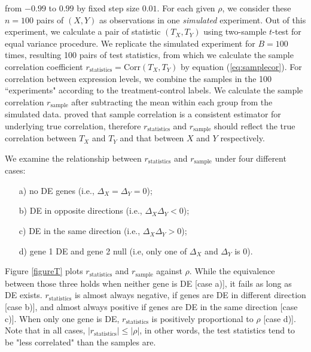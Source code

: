 \documentclass[12pt, a4paper]{article}
\newcommand{\cor}{\text{Corr}}
\begin{document}
	from $-0.99$ to $0.99$ by fixed step size $0.01$. For each given $\rho$, we consider these $n=100$ pairs of $(X, Y)$
	as observations in one \textit{simulated} experiment. Out of this experiment, we calculate a pair of statistic $(T_X, T_Y)$ using 
	two-sample $t$-test for equal variance procedure. We replicate the simulated
	experiment for $B=100$ times, resulting 100 pairs of test statistics, from which we calculate the sample correlation coefficient
	$r_\text{statistics} = \cor(T_X, T_Y)$ by equation (\ref{eq:samplecor}). For correlation between expression levels, we combine
	the samples in the 100 ``experiments" according to the treatment-control labels. We calculate
	the sample correlation $r_{\text{sample}}$ after subtracting the mean within each group from the simulated data. 
	\citet{fisher1915frequency} proved that sample correlation is a consistent estimator for underlying true correlation, therefore
		$r_\text{statistics}$ and $r_{\text{sample}}$ should reflect the true correlation between $T_X$ and $T_Y$ and 
		that between $X$ and $Y$ respectively. 
	
	We examine the relationship between $r_\text{statistics}$ and $r_{\text{sample}}$ under four different cases:
	\begin{enumerate}
		\item[a)] no DE genes (i.e., $\Delta_X = \Delta_Y  =0$);
		\item[b)]  DE in opposite directions (i.e., $\Delta_X\Delta_Y <0$);
		\item[c)] DE in the same direction (i.e., $\Delta_X\Delta_Y>0$); 
		\item[d)] gene 1 DE and gene 2 null (i.e, only one of $\Delta_X$ and $\Delta_Y$ is 0).
	\end{enumerate}
	Figure \ref{figureT} plots $r_\text{statistics}$ and $r_{\text{sample}}$ against $\rho$. While the
	equivalence between those three holds when neither gene is DE [case a)], it fails as long as DE
	exists. $r_\text{statistics}$ is almost always negative, if genes are DE in different direction
	[case b)], and almost always positive if genes are DE in the same direction [case c)]. When only one
	gene is DE,  $r_\text{statistics}$ is positively proportional to $\rho$ [case d)]. Note that in all
	cases, $|r_{\text{statistics}}| \leq |\rho|$, in other words, the test statistics tend to be "less
	correlated" than the samples are.
	
\end{document}
